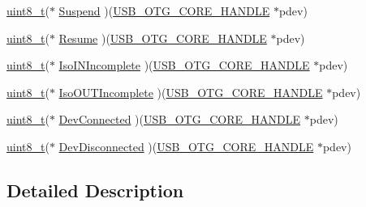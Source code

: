 \begin{DoxyCompactItemize}
\item 
\hyperlink{stdint_8h_aba7bc1797add20fe3efdf37ced1182c5}{uint8\-\_\-t}($\ast$ \hyperlink{struct___u_s_b_d___d_c_d___i_n_t_af039a1639616118c047efc22d290dfbc}{Suspend} )(\hyperlink{group___u_s_b___c_o_r_e___exported___types_gaf76054c11eb8a3367907aad7ae700e80}{U\-S\-B\-\_\-\-O\-T\-G\-\_\-\-C\-O\-R\-E\-\_\-\-H\-A\-N\-D\-L\-E} $\ast$pdev)
\item 
\hyperlink{stdint_8h_aba7bc1797add20fe3efdf37ced1182c5}{uint8\-\_\-t}($\ast$ \hyperlink{struct___u_s_b_d___d_c_d___i_n_t_a134087a55f3b8fb50c5f607b31daf737}{Resume} )(\hyperlink{group___u_s_b___c_o_r_e___exported___types_gaf76054c11eb8a3367907aad7ae700e80}{U\-S\-B\-\_\-\-O\-T\-G\-\_\-\-C\-O\-R\-E\-\_\-\-H\-A\-N\-D\-L\-E} $\ast$pdev)
\item 
\hyperlink{stdint_8h_aba7bc1797add20fe3efdf37ced1182c5}{uint8\-\_\-t}($\ast$ \hyperlink{struct___u_s_b_d___d_c_d___i_n_t_a49a931696eaa8e07ec9f84604815d8d7}{Iso\-I\-N\-Incomplete} )(\hyperlink{group___u_s_b___c_o_r_e___exported___types_gaf76054c11eb8a3367907aad7ae700e80}{U\-S\-B\-\_\-\-O\-T\-G\-\_\-\-C\-O\-R\-E\-\_\-\-H\-A\-N\-D\-L\-E} $\ast$pdev)
\item 
\hyperlink{stdint_8h_aba7bc1797add20fe3efdf37ced1182c5}{uint8\-\_\-t}($\ast$ \hyperlink{struct___u_s_b_d___d_c_d___i_n_t_a0179003ca08f3a60fc8f8b65286851d4}{Iso\-O\-U\-T\-Incomplete} )(\hyperlink{group___u_s_b___c_o_r_e___exported___types_gaf76054c11eb8a3367907aad7ae700e80}{U\-S\-B\-\_\-\-O\-T\-G\-\_\-\-C\-O\-R\-E\-\_\-\-H\-A\-N\-D\-L\-E} $\ast$pdev)
\item 
\hyperlink{stdint_8h_aba7bc1797add20fe3efdf37ced1182c5}{uint8\-\_\-t}($\ast$ \hyperlink{struct___u_s_b_d___d_c_d___i_n_t_acab02c3f3debf5ae228a0894804b5df5}{Dev\-Connected} )(\hyperlink{group___u_s_b___c_o_r_e___exported___types_gaf76054c11eb8a3367907aad7ae700e80}{U\-S\-B\-\_\-\-O\-T\-G\-\_\-\-C\-O\-R\-E\-\_\-\-H\-A\-N\-D\-L\-E} $\ast$pdev)
\item 
\hyperlink{stdint_8h_aba7bc1797add20fe3efdf37ced1182c5}{uint8\-\_\-t}($\ast$ \hyperlink{struct___u_s_b_d___d_c_d___i_n_t_acbd46d560038b25b9dfaaf405d76bcf4}{Dev\-Disconnected} )(\hyperlink{group___u_s_b___c_o_r_e___exported___types_gaf76054c11eb8a3367907aad7ae700e80}{U\-S\-B\-\_\-\-O\-T\-G\-\_\-\-C\-O\-R\-E\-\_\-\-H\-A\-N\-D\-L\-E} $\ast$pdev)
\end{DoxyCompactItemize}


\subsection{Detailed Description}


